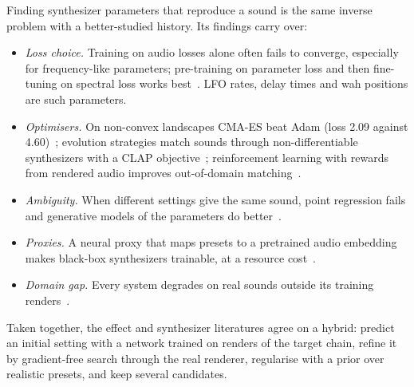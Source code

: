 Finding synthesizer parameters that reproduce a sound is the same inverse
problem with a better-studied history. Its findings carry over:
\begin{itemize}
\item \emph{Loss choice.} Training on audio losses alone often fails to
converge, especially for frequency-like parameters; pre-training on parameter
loss and then fine-tuning on spectral loss works best~\cite{masuda2021ddsp,uzrad2024diffmoog}.
LFO rates, delay times and wah positions are such parameters.
\item \emph{Optimisers.} On non-convex landscapes CMA-ES beat Adam (loss 2.09
against 4.60)~\cite{bogdan2026instrumental}; evolution strategies match
sounds through non-differentiable synthesizers with a CLAP
objective~\cite{cherep2024ctag}; reinforcement learning with rewards from
rendered audio improves out-of-domain matching~\cite{wu2026ddsynthrl}.
\item \emph{Ambiguity.} When different settings give the same sound, point
regression fails and generative models of the parameters do better~\cite{hayes2025equivariant}.
\item \emph{Proxies.} A neural proxy that maps presets to a pretrained audio
embedding makes black-box synthesizers trainable, at a resource
cost~\cite{combes2025proxies}.
\item \emph{Domain gap.} Every system degrades on real sounds outside its
training renders~\cite{hayes2024review}.
\end{itemize}
Taken together, the effect and synthesizer literatures agree on a hybrid:
predict an initial setting with a network trained on renders of the target
chain, refine it by gradient-free search through the real renderer, regularise
with a prior over realistic presets, and keep several candidates.
